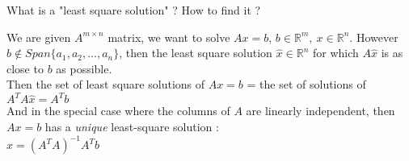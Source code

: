 \documentclass[12pt]{article}
\newcommand*{\xfield}[1]{\begin{mdframed}\centering #1\end{mdframed}\bigskip}
\newenvironment{note}{}{}
\begin{document}
\begin{note}
	\xfield{What is a "least square solution" ? How to find it ?}
	\xfield{We are given $A^{m \times n}$ matrix, we want to solve $Ax=b$, $b\in \mathbb{R}^m,\ x\in \mathbb{R}^n$. However $b \not\in Span \{a_1,a_2,...,a_n\}$, then the least square solution $\hat{x} \in \mathbb{R}^n$ for which $A\hat{x}$ is as close to $b$ as possible.\\
	Then the set of least square solutions of $Ax=b$ = the set of solutions of $A^TA\hat{x}=A^Tb$\\
	And in the special case where the columns of $A$ are linearly independent, then $Ax=b$ has a \emph{unique} least-square solution :\\
	$\hat{x} = (A^TA)^{-1}A^Tb$}
\end{note}
\end{document}

